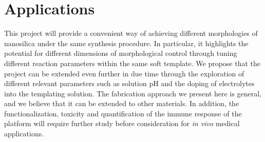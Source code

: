 \documentclass[a4paper,12pt]{article}
\begin{document}
	\section*{Applications}
	 This project will provide a convenient way of achieving different morphologies of nanosilica under the same synthesis procedure. In particular, it highlights the potential for different dimensions of morphological control through tuning different reaction parameters within the same soft template. We propose that the project can be extended even further in due time through the exploration of different relevant parameters such as solution pH and the doping of electrolytes into the templating solution.
	 \bigbreak
The fabrication approach we present here is general, and we believe that it can be extended to other materials. In addition, the functionalization, toxicity and quantification of the immune response of the platform will require further study before consideration for \textit{in vivo} medical applications.

	\printbibliography
	 
	
\end{document}
